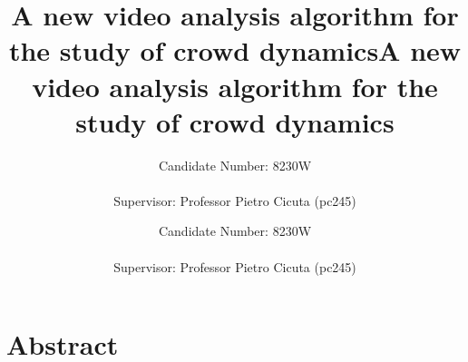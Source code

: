 \documentclass[10pt]{article}
\title{A new video analysis algorithm for the study of crowd dynamics}
\author{Candidate Number: 8230W
\\\\
Supervisor: Professor Pietro Cicuta (pc245)}
\begin{document}
\begin{titlingpage}
    \maketitle
\end{titlingpage}


\clearpage
\title{A new video analysis algorithm for the study of crowd dynamics}
\author{Candidate Number: 8230W
\\\\
Supervisor: Professor Pietro Cicuta (pc245)}
\maketitle
\section*{Abstract}
\end{document}
